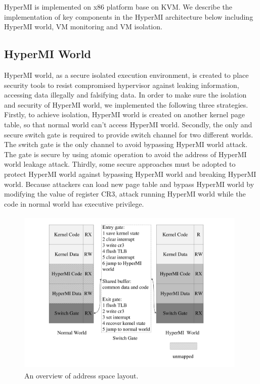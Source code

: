 \documentclass[conference]{IEEEtran}
\begin{document}
HyperMI is implemented on x86 platform base on KVM.
We describe the implementation of key components in the HyperMI architecture below including HyperMI world, VM monitoring and VM isolation.

\subsection{HyperMI World} \label {HWorld}
HyperMI world, as a secure isolated execution environment, is created to place security tools to resist compromised hypervisor against leaking information, accessing data illegally and falsifying data. 
In order to make sure the isolation and security of HyperMI world, we implemented the following three strategies.
Firstly, to achieve isolation, HyperMI world is created on another kernel page table, so that normal world can't access HyperMI world. Secondly, the only and secure switch gate is required to provide switch channel for two different worlds. The switch gate is the only channel to avoid bypassing HyperMI world attack. The gate is secure by using atomic operation to avoid the address of HyperMI world leakage attack. Thirdly, some secure approaches must be adopted to protect HyperMI world against bypassing HyperMI world and breaking HyperMI world. Because attackers can load new page table and bypass HyperMI world by modifying the value of register CR3, attack running HyperMI world while the code in normal world has executive privilege.

\begin{figure}
\centerline{\includegraphics[width=11cm, height=8cm]{pdfvmcs2.pdf}}%
\caption{An overview of address space layout.} \label{fig2}
\end{figure}
\end{document}
